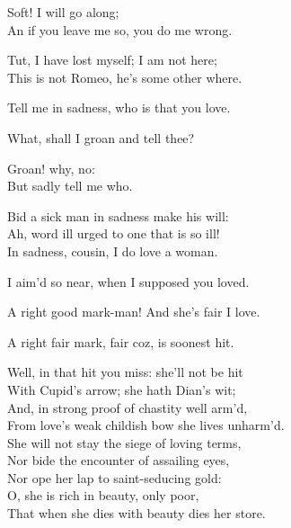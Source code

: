 \begin{speech}
Soft! I will go along; \\
An if you leave me so, you do me wrong. \\
\end{speech}
\begin{speech}
Tut, I have lost myself; I am not here; \\
This is not Romeo, he's some other where. \\
\end{speech}
\begin{speech}
Tell me in sadness, who is that you love. \\
\end{speech}
\begin{speech}
What, shall I groan and tell thee? \\
\end{speech}
\begin{speech}
Groan! why, no: \\
But sadly tell me who. \\
\end{speech}
\begin{speech}
Bid a sick man in sadness make his will: \\
Ah, word ill urged to one that is so ill! \\
In sadness, cousin, I do love a woman. \\
\end{speech}
\begin{speech}
I aim'd so near, when I supposed you loved. \\
\end{speech}
\begin{speech}
A right good mark-man! And she's fair I love. \\
\end{speech}
\begin{speech}
A right fair mark, fair coz, is soonest hit. \\
\end{speech}
\begin{speech}
Well, in that hit you miss: she'll not be hit \\
With Cupid's arrow; she hath Dian's wit; \\
And, in strong proof of chastity well arm'd, \\
From love's weak childish bow she lives unharm'd. \\
She will not stay the siege of loving terms, \\
Nor bide the encounter of assailing eyes, \\
Nor ope her lap to saint-seducing gold: \\
O, she is rich in beauty, only poor, \\
That when she dies with beauty dies her store. \\
\end{speech}
